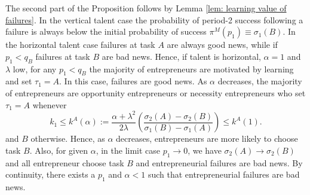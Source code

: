 \documentclass[12pt,american]{paper}
\theoremstyle{remark}
\begin{document}
 The second part of the Proposition follows by Lemma \ref{lem: learning value of failures}. In the vertical talent case the probability of period-2 success following a failure is always below the initial probability of success $\pi^M(p_1)\equiv\sigma_1(B)$. In the horizontal talent case failures at task $A$ are always good news, while if $p_1<q_B$ failures at task $B$ are bad news.  Hence, if talent is horizontal, $\alpha=1$ and $\lambda$ low, for any $p_1<q_B$  the majority of entrepreneurs are motivated by learning and set $\tau_1=A$. In this case, failures are good news. As $\alpha$ decreases, the majority of entrepreneurs are opportunity entrepreneurs or necessity entrepreneurs who  set $\tau_1=A$ whenever
\[
k_{1}\leq k^A(\alpha) := \frac{\alpha + \lambda^2}{2 \lambda}  \left( \frac{ \sigma_2(A)- \sigma_2(B)}{ \sigma_1(B)- \sigma_1(A)} \right)  \leq k^A(1). 
\]
and $B$ otherwise. Hence, as $\alpha$ decreases, entrepreneurs are more likely to choose task $B$. Also, for given $\alpha$, in the limit case $p_1 \rightarrow 0$, we have $ \sigma_2(A) \rightarrow \sigma_2(B)$ and all entrepreneur choose task $B$ and entrepreneurial failures are bad news. By continuity, there exists a $p_1$ and $\alpha<1$ such that entrepreneurial failures are bad news.
\end{document}
